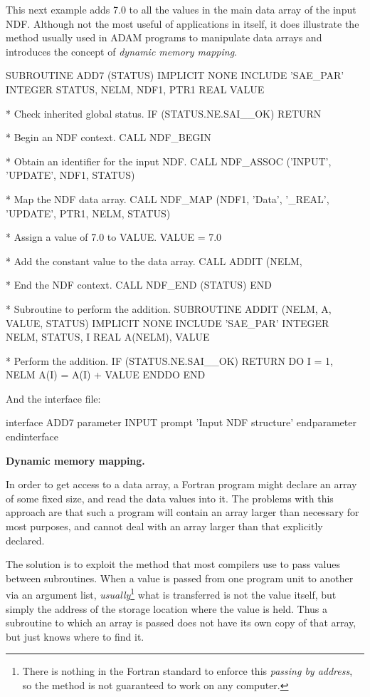 \documentclass[twoside,11pt,nolof]{starlink}
\begin{document}
This next example adds 7.0 to all the values in the main data array
of the input NDF.
Although not the most useful of applications in itself, it
does illustrate the method usually used in ADAM programs to
manipulate data arrays and introduces the
concept of {\sl dynamic memory mapping}.
\begin{terminalv}
      SUBROUTINE ADD7 (STATUS)
      IMPLICIT NONE
      INCLUDE 'SAE_PAR'
      INTEGER STATUS, NELM, NDF1, PTR1
      REAL VALUE

*  Check inherited global status.
      IF (STATUS.NE.SAI__OK) RETURN

*  Begin an NDF context.
      CALL NDF_BEGIN

*  Obtain an identifier for the input NDF.
      CALL NDF_ASSOC ('INPUT', 'UPDATE', NDF1, STATUS)

*  Map the NDF data array.
      CALL NDF_MAP (NDF1, 'Data', '_REAL', 'UPDATE', PTR1, NELM, STATUS)

*  Assign a value of 7.0 to VALUE.
      VALUE = 7.0

*  Add the constant value to the data array.
      CALL ADDIT (NELM, %

*  End the NDF context.
      CALL NDF_END (STATUS)
      END

*  Subroutine to perform the addition.
      SUBROUTINE ADDIT (NELM, A, VALUE, STATUS)
      IMPLICIT NONE
      INCLUDE 'SAE_PAR'
      INTEGER NELM, STATUS, I
      REAL A(NELM), VALUE

*   Perform the addition.
      IF (STATUS.NE.SAI__OK) RETURN
      DO I = 1, NELM
         A(I) = A(I) + VALUE
      ENDDO
      END
\end{terminalv}
And the interface file:
\begin{terminalv}
interface ADD7
  parameter      INPUT
     prompt      'Input NDF structure'
  endparameter
endinterface
\end{terminalv}
\newpage
{\large\bf Dynamic memory mapping.}

In order to get access to a data array, a Fortran program might
declare an array of some fixed size, and read the data values
into it.
The problems with this approach are that such a program will
contain an array larger than necessary for most purposes, and
cannot deal with an array larger than that explicitly declared.

The solution is to exploit the method that most compilers
use to pass values between subroutines.
When a value is passed from one program unit to another via an argument
list,
{\sl usually}\footnote{There is nothing in the Fortran standard to enforce this
{\sl passing by address}, so the method is not guaranteed to work on any
computer.}
what is transferred is not the value itself, but simply the address of the
storage location where the value is held.
Thus a subroutine to which an array is passed does not have its own copy
of that array, but just knows where to find it.
\end{document}
